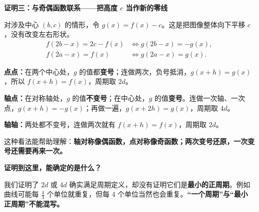 \begin{proofbox}
\textbf{\textcolor{CProof}{证明三：与奇偶函数联系——把高度 $c$ 当作新的零线}}



对涉及中心 $(b,c)$ 的情形，令 $g(x)=f(x)-c$。这是把图像整体向下平移 $c$，没有改变左右形状。
\[
\begin{aligned}
 f(2b-x)=2c-f(x)
 &\iff g(2b-x)=-g(x),\\
 f(2a-x)=f(x)
 &\iff g(2a-x)=g(x).
\end{aligned}
\]

\textbf{点点：}在两个中心处，$g$ 的值都\textbf{变号}；连做两次，负号抵消，$g(x+h)=g(x)$，所以 $f(x+h)=f(x)$，周期取 $2d$。

\textbf{轴点：}在对称轴处，$g$ 的值\textbf{不变号}；在中心处，$g$ 的值\textbf{变号}。连做一次轴、一次点，$g(x+h)=-g(x)$；再做一遍，$g(x+2h)=g(x)$，周期取 $4d$。

\textbf{轴轴：}两处都不变号，连做两次就有 $f(x+h)=f(x)$，周期取 $2d$。

这种看法能帮助理解：\textbf{轴对称像偶函数，点对称像奇函数；两次变号还原，一次变号还需要再来一次。}

\medskip
\textbf{\textcolor{CProof}{证明到这里，能确定的是什么？}}

我们证明了 $2d$ 或 $4d$ 确实满足周期定义，却没有证明它们是\textbf{最小的正周期}。例如曲线可能每 $\tfrac43$ 个单位就重复，但每 $4$ 个单位当然也会重复。\textbf{“一个周期”与“最小正周期”不能混写。}
\end{proofbox}
